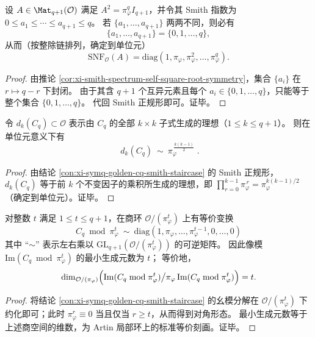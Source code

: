 \begin{corollary}[互异指数的阶梯刚性]\label{cor:xi-smith-staircase-rigidity-distinct}
设 \(A\in\Mat_{q+1}(\mathcal O)\) 满足 \(A^2=\pi_\varphi^q I_{q+1}\)，并令其 Smith 指数为 \(0\le a_1\le\cdots\le a_{q+1}\le q\)。
若 \(\{a_1,\dots,a_{q+1}\}\) 两两不同，则必有
\[
\{a_1,\dots,a_{q+1}\}=\{0,1,\dots,q\},
\]
从而（按整除链排列，确定到单位元）
\[
\mathrm{SNF}_{\mathcal O}(A)=\mathrm{diag}(1,\pi_\varphi,\pi_\varphi^2,\dots,\pi_\varphi^{q}).
\]
\end{corollary}
\begin{proof}
由推论 \ref{cor:xi-smith-spectrum-self-square-root-symmetry}，集合 \(\{a_i\}\) 在 \(r\mapsto q-r\) 下封闭。
由于其含 \(q+1\) 个互异元素且每个 \(a_i\in\{0,1,\dots,q\}\)，只能等于整个集合 \(\{0,1,\dots,q\}\)。
代回 Smith 正规形即可。证毕。
\end{proof}

\begin{corollary}\label{cor:xi-symq-golden-cq-determinantal-divisors}
令 \(d_k(C_q)\subset\mathcal O\) 表示由 \(C_q\) 的全部 \(k\times k\) 子式生成的理想（\(1\le k\le q+1\)）。
则在单位元意义下有
\[
\boxed{\;
d_k(C_q)\ \sim\ \pi_\varphi^{\,\frac{k(k-1)}{2}}\; }.
\]
\end{corollary}
\begin{proof}
由结论 \ref{con:xi-symq-golden-cq-smith-staircase} 的 Smith 正规形，
\(d_k(C_q)\) 等于前 \(k\) 个不变因子的乘积所生成的理想，即
\(
\prod_{r=0}^{k-1}\pi_\varphi^{\,r}=\pi_\varphi^{k(k-1)/2}
\)（确定到单位元）。证毕。
\end{proof}

\begin{corollary}\label{cor:xi-symq-golden-cq-mod-pi-power-staircase}
对整数 \(t\) 满足 \(1\le t\le q+1\)，在商环 \(\mathcal O/(\pi_\varphi^t)\) 上有等价变换
\[
\boxed{\;
C_q\bmod \pi_\varphi^t
\ \sim\
\mathrm{diag}(1,\pi_\varphi,\dots,\pi_\varphi^{t-1},0,\dots,0)\;}
\]
其中 “\(\sim\)” 表示左右乘以 \(\mathrm{GL}_{q+1}(\mathcal O/(\pi_\varphi^t))\) 的可逆矩阵。
因此像模 \(\mathrm{Im}(C_q\bmod \pi_\varphi^t)\) 的最小生成元数为 \(t\)；
等价地，
\[
\dim_{\mathcal O/(\pi_\varphi)}\Bigl(\mathrm{Im}(C_q\bmod \pi_\varphi^t)\big/\pi_\varphi\,\mathrm{Im}(C_q\bmod \pi_\varphi^t)\Bigr)=t.
\]
\end{corollary}
\begin{proof}
将结论 \ref{con:xi-symq-golden-cq-smith-staircase} 的幺模分解在 \(\mathcal O/(\pi_\varphi^t)\) 下约化即可；此时 \(\pi_\varphi^{r}\equiv 0\) 当且仅当 \(r\ge t\)，从而得到对角形态。
最小生成元数等于上述商空间的维数，为 Artin 局部环上的标准等价刻画。证毕。
\end{proof}

